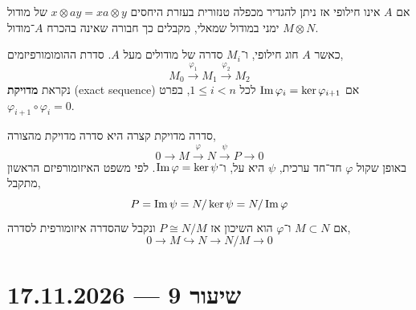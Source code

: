 \begin{remark}
	אם $A$ אינו חילופי אז ניתן להגדיר מכפלה טנזורית בעזרת היחסים $x \otimes a y = x a \otimes y$ של מודול ימני במודול שמאלי, מקבלים כך חבורה שאינה בהכרח $A$־מודול $M \otimes N$.
\end{remark}
\begin{definition}
	כאשר $A$ חוג חילופי, ו־$M_i$ סדרה של מודולים מעל $A$.
	סדרת ההומומורפיזמים,
	\[
		M_0
		\xrightarrow{\varphi_1} M_1
		\xrightarrow{\varphi_2} M_2
	\]
	נקראת \textbf{מדויקת} (exact sequence) אם $\operatorname{Im} \varphi_i = \ker \varphi_{i + 1}$ לכל $1 \le i < n$, בפרט $\varphi_{i + 1} \circ \varphi_i = 0$.
\end{definition}
\begin{notation}
	סדרה מדויקת קצרה היא סדרה מדויקת מהצורה,
	\[
		0
		\to M
		\xrightarrow{\varphi} N
		\xrightarrow{\psi} P
		\to 0
	\]
	באופן שקול $\varphi$ חד־חד ערכית, $\psi$ היא על, ו־$\operatorname{Im} \varphi = \ker \psi$.
	לפי משפט האיזומורפיזם הראשון מתקבל,
	\[
		P
		= \operatorname{Im} \psi
		= N / \ker \psi
		= N / \operatorname{Im} \varphi
	\]
	אם $M \subset N$ ו־$\varphi$ הוא השיכון אז $P \cong N / M$ ונקבל שהסדרה איזומורפית לסדרה,
	\[
		0
		\to M
		\hookrightarrow N
		\to N / M
		\to 0
	\]
\end{notation}

\section{שיעור 9 --- 17.11.2026}
